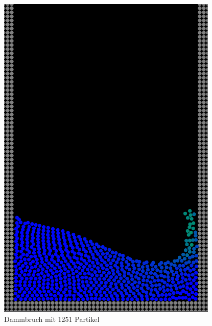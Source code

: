 \documentclass[11pt,
a4paper,
parskip=half, %
BCOR=10mm, %
english,
ngerman]{scrreprt}
\begin{document}
\begin{figure}[htb]
    \begin{minipage}[t]{0.45\linewidth}
        \centering
        \includegraphics[width=0.7\linewidth]{Dammbruch_Experiment1.png}
        \caption{Dammbruch mit 1251 Partikel}
        \label{image:breaking_dam_experiment1}
    \end{minipage}
    \hfill
    \begin{minipage}[t]{0.45\linewidth}
        \centering

\end{minipage}
\end{figure}
\end{document}

